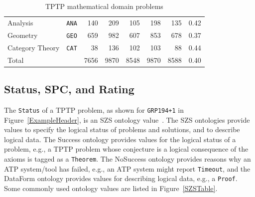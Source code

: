 \documentclass[runningheads]{llncs}
\begin{document}
\begin{table}[tb]
\begin{center}
\begin{tabular}{lr|rr|rrrr}
Analysis            & {\tt ANA} &  140 &  209 &  105 &  198 &  135 & 0.42 \\
Geometry            & {\tt GEO} &  659 &  982 &  607 &  853 &  678 & 0.37 \\
Category Theory     & {\tt CAT} &   38 &  136 &  102 &  103 &   88 & 0.44 \\
\hline
Total               &           & 7656 & 9870 & 8548 & 9870 & 8588 & 0.40 \\
\end{tabular}
\end{center}
\caption{TPTP mathematical domain problems}
\label{Domains}
\end{table}

\subsection{Status, SPC, and Rating}
\label{Characteristics}

The {\tt Status} of a TPTP problem, as shown for {\tt GRP194+1} in Figure~\ref{ExampleHeader}, is 
an SZS ontology value~\cite{Sut08-KEAPPA}.
The SZS ontologies provide values to specify the logical status of problems and solutions, and 
to describe logical data.
The Success ontology provides values for the logical status of a problem, e.g., a TPTP problem 
whose conjecture is a logical consequence of the axioms is tagged as a {\tt Theorem}.
The NoSuccess ontology provides reasons why an ATP system/tool has failed, e.g., an ATP system 
might report {\tt Timeout}, and the DataForm ontology provides values for describing logical 
data, e.g., a {\tt Proof}.
Some commonly used ontology values are listed in Figure~\ref{SZSTable}.

\end{document}
